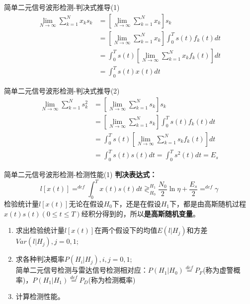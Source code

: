\begin{frame}{简单二元信号波形检测-判决式推导(1)}
\begin{align*}
\lim\limits_{N\to\infty}\sum\limits_{k=1}^{N}x_ks_k&=\left[\lim\limits_{N\to\infty}\sum\limits_{k=1}^{N}x_k\right]s_k\\
&=\left[\lim\limits_{N\to\infty}\sum\limits_{k=1}^{N}x_k\right]\int_{0}^{T}s(t)f_k(t)dt\\
&=\int_{0}^{T}s(t)\left[\lim\limits_{N\to\infty}\sum\limits_{k=1}^{N}x_kf_k(t)\right]dt\\
&=\int_{0}^{T}s(t)x(t)dt
\end{align*}
\end{frame}

\begin{frame}{简单二元信号波形检测-判决式推导(2)}
\begin{align*}
\lim\limits_{N\to\infty}\sum\limits_{k=1}^{N}s_k^2&=\left[\lim\limits_{N\to\infty}\sum\limits_{k=1}^{N}s_k\right]s_k\\
&=\left[\lim\limits_{N\to\infty}\sum\limits_{k=1}^{N}s_k\right]\int_{0}^{T}s(t)f_k(t)dt\\
&=\int_{0}^{T}s(t)\left[\lim\limits_{N\to\infty}\sum\limits_{k=1}^{N}s_kf_k(t)\right]dt\\
&=\int_{0}^{T}s(t)s(t)dt=\int_{0}^{T}s^2(t)dt=E_s
\end{align*}
\end{frame}

\begin{frame}{简单二元信号波形检测-检测性能(1)}
\textbf{判决表达式：}
\[l[x(t)]\mathop{=}^{def}\int_{0}^{T}x(t)s(t)dt\mathop{\gtrless}_{H_0}^{H_1}\frac{N_0}{2}\ln\eta+\frac{E_s}{2}\mathop{=}^{def}\gamma \]
检验统计量$l[x(t)]$无论在假设$H_0$下，还是在假设$H_1$下，都是由高斯随机过程$x(t)s(t)(0\le t\le T)$经积分得到的，所以\textbf{是高斯随机变量}。
\begin{enumerate}
	\item 求出检验统计量$l[x(t)]$在两个假设下的均值$E(l|H_j)$和方差$Var(l|H_j),j=0,1$;
	\item 求各种判决概率$P(H_i|H_j),i,j=0,1$;\\
	简单二元信号检测与雷达信号检测相对应：$P(H_1|H_0)\mathop{=}\limits^{def}P_F$(称为虚警概率)，$P(H_1|H_1)\mathop{=}\limits^{def}P_D$(称为检测概率)
	\item 计算检测性能。
\end{enumerate}
\end{frame}

